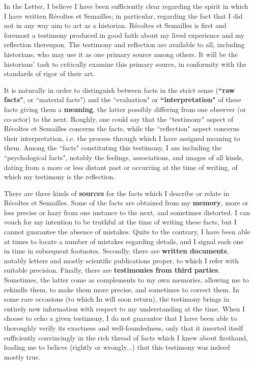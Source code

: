 In the Letter, I believe I have been sufficiently clear regarding the spirit in which I have written R\'ecoltes et Semailles; in particular, regarding the fact that I did not in any way aim to act as a historian. R\'ecoltes et Semailles is first and foremost a testimony produced in good faith about my lived experience and my reflection thereupon. The testimony and reflection are available to all, including historians, who may use it as one primary source among others. It will be the historians' task to critically examine this primary source, in conformity with the standards of rigor of their art.

It is naturally in order to distinguish between facts in the strict sense (\textbf{``raw facts"}, or ``material facts") and the ``evaluation" or \textbf{``interpretation"} of these facts giving them a \textbf{meaning}, the latter possibly differing from one observer (or co-actor) to the next. Roughly, one could say that the ``testimony" aspect of R\'ecoltes et Semailles concerns the facts, while the ``reflection" aspect concerns their interpretation, i.e. the process through which I have assigned meaning to them. Among the ``facts" constituting this testimony, I am including the ``psychological facts", notably the feelings, associations, and images of all kinds, dating from a more or less distant past or occurring at the time of writing, of which my testimony is the reflection.

There are three kinds of \textbf{sources} for the facts which I describe or relate in R\'ecoltes et Semailles. Some of the facts are obtained from my \textbf{memory}, more or less precise or hazy from one instance to the next, and sometimes distorted. I can vouch for my intention to be truthful at the time of writing these facts, but I cannot guarantee the absence of mistakes. Quite to the contrary, I have been able at times to locate a number of mistakes regarding details, and I signal each one in time in subsequent footnotes. Secondly, there are \textbf{written documents}, notably letters and mostly scientific publications proper, to which I refer with suitable precision. Finally, there are \textbf{testimonies from third parties}. Sometimes, the latter come as complements to my own memories, allowing me to rekindle them, to make them more precise, and sometimes to correct them. In some rare occasions (to which In will soon return), the testimony brings in entirely new information with respect to my understanding at the time. When I choose to echo a given testimony, I do not guarantee that I have been able to thoroughly verify its exactness and well-foundedness, only that it inserted itself sufficiently convincingly in the rich thread of facts which I knew about firsthand, leading me to believe (rightly or wrongly...) that this testimony was indeed mostly true.

